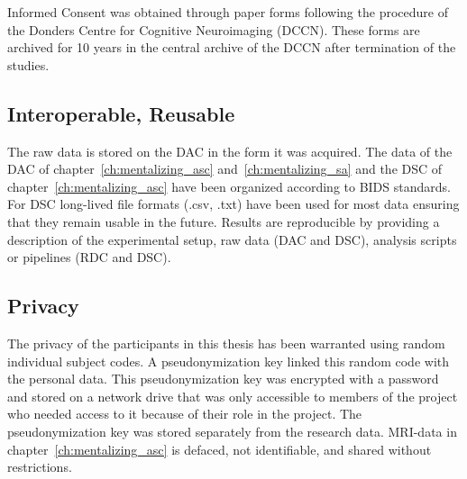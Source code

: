Informed Consent was obtained through paper forms following the procedure of the Donders Centre for Cognitive Neuroimaging (DCCN). These forms are archived for 10 years in the central archive of the DCCN after termination of the studies. 
    
\subsection*{Interoperable, Reusable}
The raw data is stored on the DAC in the form it was acquired. The data of the DAC of chapter~\ref{ch:mentalizing_asc} and~\ref{ch:mentalizing_sa} and the DSC of chapter~\ref{ch:mentalizing_asc} have been organized according to BIDS standards. For DSC long-lived file formats (.csv, .txt) have been used for most data ensuring that they remain usable in the future. Results are reproducible by providing a description of the experimental setup, raw data (DAC and DSC), analysis scripts or pipelines (RDC and DSC).

\subsection*{Privacy}
The privacy of the participants in this thesis has been warranted using random individual subject codes. A pseudonymization key linked this random code with the personal data. This pseudonymization key was encrypted with a password and stored on a network drive that was only accessible to members of the project who needed access to it because of their role in the project. The pseudonymization key was stored separately from the research data. MRI-data in chapter~\ref{ch:mentalizing_asc} is defaced, not identifiable, and shared without restrictions.

